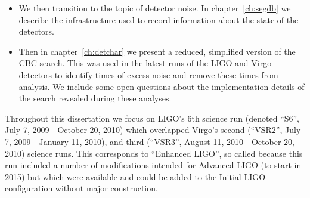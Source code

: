\begin{itemize}
\item We then transition to the topic of detector noise.  In
chapter~\ref{ch:segdb} we describe the infrastructure used to record 
information about the state of the detectors.

\item Then in chapter~\ref{ch:detchar} we present a reduced,
simplified version of the CBC search.  This was used in the latest
runs of the LIGO and Virgo detectors to identify times of excess noise
and remove these times from analysis.  We include some open questions
about the implementation details of the search revealed during these
analyses.

\end{itemize}

Throughout this dissertation we focus on LIGO's 6th science run
(denoted ``S6'', July 7, 2009 - October 20, 2010) which overlapped
Virgo's second (``VSR2'', July 7, 2009 - January 11, 2010), and third
(``VSR3'', August 11, 2010 - October 20, 2010) science runs.  This
corresponds to ``Enhanced LIGO'', so called because this run included
a number of modifications intended for Advanced LIGO (to start in
2015) but which were available and could be added to the Initial LIGO
configuration without major construction.

